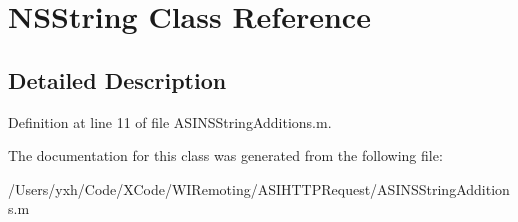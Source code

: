 \hypertarget{class_n_s_string}{
\section{NSString Class Reference}
\label{class_n_s_string}
}


\subsection{Detailed Description}


Definition at line 11 of file ASINSStringAdditions.m.

The documentation for this class was generated from the following file:\begin{DoxyCompactItemize}
\item 
/Users/yxh/Code/XCode/WIRemoting/ASIHTTPRequest/ASINSStringAdditions.m\end{DoxyCompactItemize}
